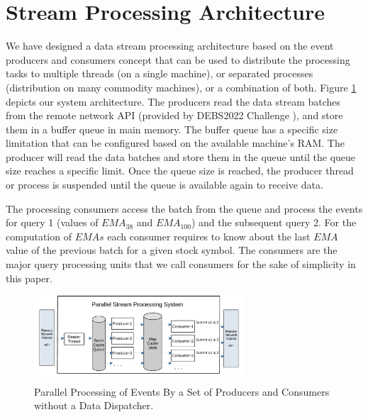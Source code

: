 \section{Stream Processing Architecture}\label{sec:concepts}
We have designed a data stream processing architecture based on the event producers and consumers concept that can be used to distribute the processing tasks to multiple threads (on a single machine), or  separated processes (distribution on many commodity machines), or a combination of both. 
Figure \ref{fig:parallel-srream-processing1} depicts our system architecture. The producers read the data stream batches from the remote  network API (provided by DEBS2022 Challenge \cite{debs2022challenge}), and store them in a buffer queue in main memory. 
The buffer queue has a specific size limitation that can be configured based  on the available machine's RAM. The producer will read the data batches and store them in the queue until the queue size reaches a specific limit. Once the queue size is reached, the producer thread or process is suspended until the queue is available again to receive data.

The processing consumers access the batch from the queue and process the events for query 1 (values of $EMA_{38}$ and $EMA_{100}$) 
and the subsequent query 2. For the computation of $EMAs$ each consumer requires to know about the last $EMA$ value of the previous batch for a given stock symbol. 
The consumers are the major query processing units that we call consumers for the sake of simplicity in this paper. 

\begin{figure}[!ht]
    \begin{center}
        \includegraphics[width=0.7\textwidth]{./images/Parallel-Stream-Processing-System_v2}
        \caption{Parallel Processing of Events By a Set of Producers and Consumers without a Data Dispatcher.}
        \label{fig:parallel-srream-processing1}
    \end{center}
\end{figure}

